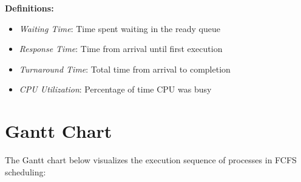 \documentclass{article}
\begin{document}
\textbf{Definitions:}
\begin{itemize}
  \item \textit{Waiting Time}: Time spent waiting in the ready queue
  \item \textit{Response Time}: Time from arrival until first execution
  \item \textit{Turnaround Time}: Total time from arrival to completion
  \item \textit{CPU Utilization}: Percentage of time CPU was busy
\end{itemize}

\section{Gantt Chart}
The Gantt chart below visualizes the execution sequence of processes in FCFS scheduling:
\end{document}
